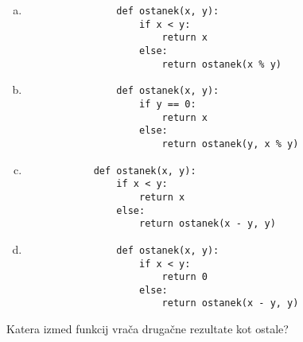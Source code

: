 \documentclass[arhiv, 10pt]{../izpit}
\begin{document}
        \begin{multicols}{2}
        \begin{enumerate}[(a)]
\item 
                \begin{verbatim}
                def ostanek(x, y):
                    if x < y:
                        return x
                    else:
                        return ostanek(x % y)
                \end{verbatim}
            
\item 
                \begin{verbatim}
                def ostanek(x, y):
                    if y == 0:
                        return x
                    else:
                        return ostanek(y, x % y)
                \end{verbatim}
            
\item 
            \begin{verbatim}
            def ostanek(x, y):
                if x < y:
                    return x
                else:
                    return ostanek(x - y, y)
            \end{verbatim}
        
\item 
                \begin{verbatim}
                def ostanek(x, y):
                    if x < y:
                        return 0
                    else:
                        return ostanek(x - y, y)
                \end{verbatim}
            
\end{enumerate}

        \end{multicols}
    
        \naloga*
        
        Katera izmed funkcij vrača drugačne rezultate kot ostale?
    
\end{document}
